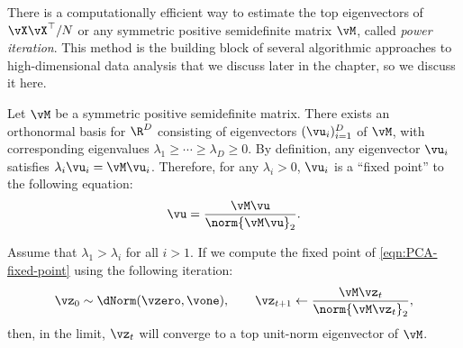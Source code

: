 \documentclass[../../book-main.tex]{subfiles}
\begin{document}
There is a computationally efficient way to estimate the top
eigenvectors of \(\vX\vX^{\top}/N\) or any symmetric positive
semidefinite matrix \(\vM\), called \textit{power iteration}. This
method is the building block of several algorithmic approaches to
high-dimensional data analysis that we discuss later in the chapter,
so we discuss it here.

Let \(\vM\) be a symmetric positive semidefinite matrix. There exists
an orthonormal basis for \(\R^{D}\) consisting of eigenvectors
\((\vu_{i})_{i = 1}^{D}\) of \(\vM\), with corresponding eigenvalues
\(\lambda_{1} \geq \cdots \geq \lambda_{D} \geq 0\). By definition,
any eigenvector $\vu_i$ satisfies $\lambda_i \vu_i = \vM \vu_i$.
Therefore, for any $\lambda_i > 0$, $\vu_i$ is a   ``fixed point'' to
the following equation:
\begin{equation}
    \vu = \frac{\vM\vu}{\norm{\vM\vu}_{2}}.
    \label{eqn:PCA-fixed-point}
\end{equation}

\begin{theorem}
    Assume that \(\lambda_{1} > \lambda_{i}\) for all \(i > 1\). If
    we compute the fixed point of  \eqref{eqn:PCA-fixed-point} using
    the following iteration:
    \begin{equation}\label{eq:power_iteration}
        \vz_{0} \sim \dNorm(\vzero, \vone), \qquad \vz_{t + 1} \gets
        \frac{\vM\vz_{t}}{\norm{\vM\vz_{t}}_{2}},
    \end{equation}
    then, in the limit, \(\vz_{t}\) will converge to a top unit-norm
    eigenvector of \(\vM\).
\end{theorem}
\end{document}
